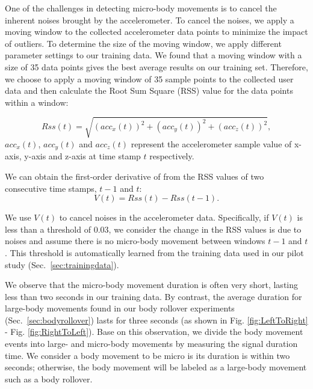  One of the challenges in detecting micro-body movements is to cancel the inherent noises brought by the
accelerometer. To cancel the noises, we apply a moving window to the collected accelerometer data points to minimize the impact of
outliers. To determine the size of the moving window, we apply different parameter settings to our training data. We found that a moving
window with a size of 35 data points gives the best average results on our training set. Therefore, we choose to apply a moving window of 35
sample points to the collected user data and then calculate the Root Sum Square (RSS) value for the data points within a window:

\begin{equation}
      Rss(t) =\sqrt{(acc_x(t))^{2}+(acc_y(t))^{2}+(acc_z(t))^{2}},
\end{equation}
$acc_x(t)$, $acc_y(t)$ and $acc_z(t)$ represent the accelerometer sample value of x-axis, y-axis and z-axis at time stamp $t$ respectively.


We can obtain the first-order derivative of from the RSS values of two consecutive time stamps, $t-1$ and $t$:
\begin{equation}
      V(t)=Rss(t)-Rss(t-1).
      \label{eq:nc}
\end{equation}

We use $V(t)$ to cancel noises in the accelerometer data. Specifically, if $V(t)$ is less than a threshold of $0.03$, we consider the
change in the RSS values is due to noises and assume there is no micro-body movement between windows $t-1$ and $t$. This threshold is
automatically learned from the training data used in our pilot study (Sec.~\ref{sec:trainingdata}).


 We observe that the micro-body movement duration is often very short, lasting less
than two seconds in our training data. By contrast, the average duration for large-body movements found in our body rollover experiments
(Sec.~\ref{sec:bodyrollover}) lasts for three seconds (as shown in Fig. \ref{fig:LeftToRight} - Fig. \ref{fig:RightToLeft}). Base on this
observation, we divide the body movement events into large- and micro-body movements by measuring the signal duration time. We consider a
body movement to be micro is its duration is within two seconds; otherwise, the body movement will be labeled as a large-body movement such
as a body rollover.

